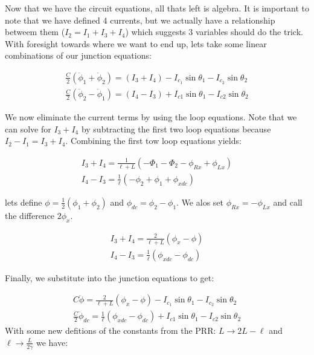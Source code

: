 \documentclass[paper=a4, twocolumn, fontsize=10pt]{article} %
\numberwithin{equation}{section} %
\numberwithin{figure}{section} %
\numberwithin{table}{section} %
\begin{document}
Now that we have the circuit equations, all thats left is algebra. It is important to note that we have defined 4 currents, but we actually have a relationship betweem them ($I_2 = I_1 + I_3 + I_4$) which suggests 3 variables should do the trick. With foresight towards where we want to end up, lets take some linear combinations of our junction equations:

\begin{align}
\frac{C}{2} (\ddot{\phi}_1 + \ddot{\phi}_2 ) = (I_3 + I_4) - I_{c_1} \sin \theta_1 - I_{c_2} \sin \theta_2
\\
\frac{C}{2} (\ddot{\phi}_2 - \ddot{\phi}_1 ) = (I_4 - I_3) +I_{c1} \sin\theta_1 - I_{c2} \sin \theta_2
\end{align}

We now eliminate the current terms by using the loop equations. Note that we can solve for $I_3+I_4$ by subtracting the first two loop equations because $I_2 - I_1 = I_3+I_4$. Combining the first tow loop equations yields:

\begin{align}
    I_3 + I_4 = \frac{1}{\ell+L}\left(- \Phi_1 - \Phi_2 - \phi_{Rx} + \phi_{Lx} \right)
    \\
    I_4 - I_3 =\frac{1}{\ell}\left( -\phi_2 + \phi_1 +\phi_{xdc}\right)
    \end{align}


lets define $\phi = \frac{1}{2}\left(\phi_1 + \phi_2\right)$ and $\phi_{dc} = \phi_2 - \phi_1$. We alos set $\phi_{Rx} = -\phi_{Lx}$ and call the difference $2\phi_{x}$.

\begin{align}
    I_3 + I_4 = \frac{2}{\ell+L}\left(\phi_x - \phi \right)
    \\
    I_4 - I_3 =\frac{1}{\ell}\left(\phi_{xdc} - \phi_{dc} \right)
    \end{align}

Finally, we substitute into the junction equations to get:


\begin{align}
    C \ddot{\phi} = \frac{2}{\ell+L}\left( \phi_x - \phi \right) - I_{c_1} \sin \theta_1 - I_{c_2} \sin \theta_2
    \\
    \frac{C}{2} \ddot{\phi}_{dc}= \frac{1}{\ell}\left( \phi_{xdc} -\phi_{dc}\right) +I_{c1} \sin\theta_1 - I_{c2} \sin \theta_2
    \end{align}
With some new defitions of the constants from the PRR: $L\to 2L-\ell$ and $\ell \to \frac{L}{2\gamma}$ we have:
\end{document}
